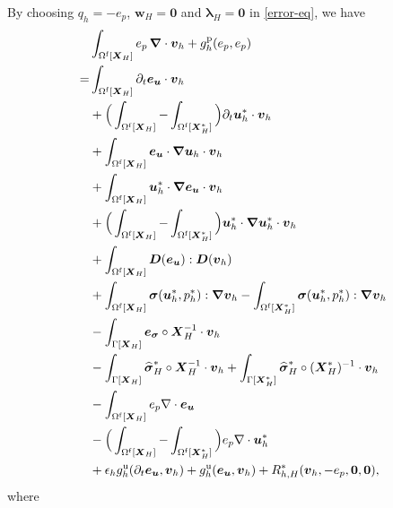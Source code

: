 \documentclass[11pt,reqno]{amsart}
\theoremstyle{definition}
\theoremstyle{plain}
\numberwithin{theorem}{section}
\numberwithin{proposition}{section}
\numberwithin{lemma}{section}
\numberwithin{equation}{section}
\newcommand{\bs}[1]{\boldsymbol{#1}}
\newcommand{\uu}[1]  {{\bs{#1}} }
\newcommand{\grad}   { \uu{\nabla}    }
\newcommand{\bv}{{\bs v}}
\newcommand{\bu}{\uu{u}}
\renewcommand{\(}{\bigl(}
\renewcommand{\)}{\bigr)}
\begin{document}
By choosing $q_h=-e_p$, ${\bs w}_H=\bs 0$ and ${\bs\lambda}_H=\bs 0$ in \eqref{error-eq}, %
we have 
\begin{subequations}\label{ep-divvh-eq}
\begin{align}
& \int_{\Omega^{\rm f}[\bs X_H]}  e_p \,\grad\cdot \bv_h
 + g_h^{\rm p} (e_p,e_p) \notag\\
= & \int_{\Omega^{\rm f}[\bs X_H]} \partial_t {\bs e}_{\bs u} \cdot {\bs v}_h \label{ep-divvh-a}\\
& + \Big( \int_{\Omega^{\rm f}[\bs X_H]} - \int_{\Omega^{\rm f}[\bs X_H^*]} \Big) \partial_t {\bs u}_h^* \cdot {\bs v}_h \label{ep-divvh-b}\\
& + \int_{\Omega^{\rm f}[\bs X_H]} {\bs e}_{\bs u} \cdot \grad \bu_h \cdot {\bs v}_h \label{ep-divvh-c}\\
& + \int_{\Omega^{\rm f}[\bs X_H]} {\bs u}_h^* \cdot \grad {\bs e}_{\bs u}  \cdot {\bs v}_h \label{ep-divvh-d}\\
& + \Big( \int_{\Omega^{\rm f}[\bs X_H]} - \int_{\Omega^{\rm f}[\bs X_H^*]} \Big) {\bs u}_h^* \cdot \grad {\bs u}_h^* \cdot {\bs v}_h \label{ep-divvh-e}\\
&
+ \int_{\Omega^{\rm f}[\bs X_H]} \bs D({\bs e}_{\bs u}): \bs D(\bv_h) \label{ep-divvh-f}\\ 
& + \int_{\Omega^{\rm f}[\bs X_H]} {\bs\sigma}(\bu_h^*,p_h^*): \grad \bv_h 
- \int_{\Omega^{\rm f}[\bs X_H^*]} {\bs\sigma}(\bu_h^*,p_h^*): \grad \bv_h \label{ep-divvh-g}\\
& - \int_{\Gamma[\bs X_H]} {\bs e}_{\bs\sigma}\circ{\bs X}_H^{-1} \cdot  \bv_h \label{ep-divvh-h}\\
& - \int_{\Gamma[\bs X_H]} {\widehat{\bs \sigma}}_H^*\circ{\bs X}_H^{-1} \cdot \bv_h  
+ \int_{\Gamma[\bs X_H^*]} {\widehat{\bs \sigma} }_H^*\circ({\bs X}_H^*)^{-1}  \cdot \bv_h \label{ep-divvh-i} \\
&- \int_{\Omega^{\rm f}[\bs X_H]} e_p \nabla\cdot  {\bs e}_{\bs u}\label{ep-1505}\\
& - \Big( \int_{\Omega^{\rm f}[\bs X_H]} - \int_{\Omega^{\rm f}[\bs X_H^*]} \Big) e_p \nabla\cdot   \bu_h^* \label{ep-divu-h}\\
& + \epsilon_h g_h^{\rm u} (\partial_t{\bs e}_{\bs u},\bv_h) + g_h^{\rm u} ({\bs e}_{\bs u},\bv_h) + R_{h,H}^*({\bs v}_h, -e_p, \bs 0, \bs 0) , \label{ep-divvh-j} 
\end{align}
\end{subequations}
where
\end{document}
